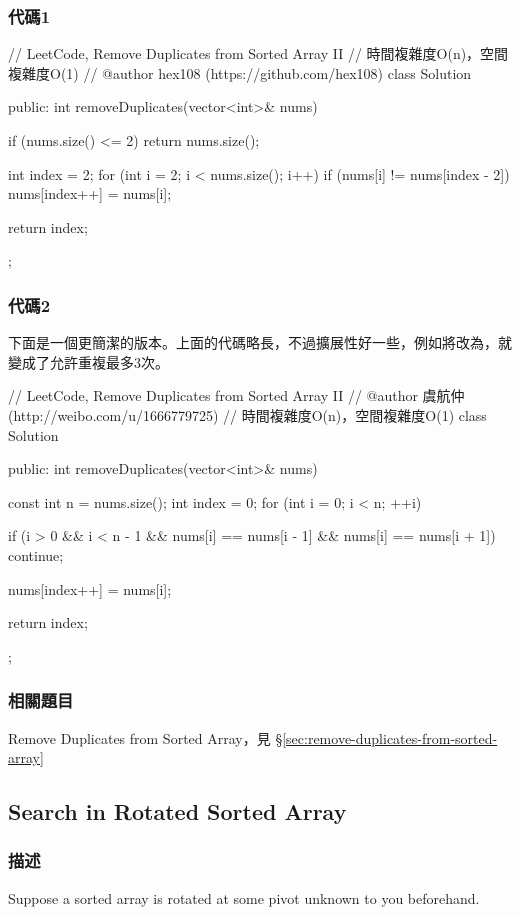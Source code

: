 \subsubsection{代碼1}
\begin{Code}
// LeetCode, Remove Duplicates from Sorted Array II
// 時間複雜度O(n)，空間複雜度O(1)
// @author hex108 (https://github.com/hex108)
class Solution {
public:
    int removeDuplicates(vector<int>& nums) {
        if (nums.size() <= 2) return nums.size();

        int index = 2;
        for (int i = 2; i < nums.size(); i++){
            if (nums[i] != nums[index - 2])
                nums[index++] = nums[i];
        }

        return index;
    }
};
\end{Code}


\subsubsection{代碼2}
下面是一個更簡潔的版本。上面的代碼略長，不過擴展性好一些，例如將改為，就變成了允許重複最多3次。
\begin{Code}
// LeetCode, Remove Duplicates from Sorted Array II
// @author 虞航仲 (http://weibo.com/u/1666779725)
// 時間複雜度O(n)，空間複雜度O(1)
class Solution {
public:
    int removeDuplicates(vector<int>& nums) {
        const int n = nums.size();
        int index = 0;
        for (int i = 0; i < n; ++i) {
            if (i > 0 && i < n - 1 && nums[i] == nums[i - 1] && nums[i] == nums[i + 1])
                continue;

            nums[index++] = nums[i];
        }
        return index;
    }
};
\end{Code}


\subsubsection{相關題目}

\begindot
\item Remove Duplicates from Sorted Array，見 \S \ref{sec:remove-duplicates-from-sorted-array}
\myenddot


\subsection{Search in Rotated Sorted Array}
\label{sec:search-in-rotated-sorted-array}


\subsubsection{描述}
Suppose a sorted array is rotated at some pivot unknown to you beforehand.

